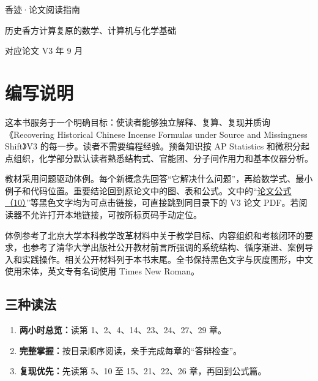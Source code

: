 \documentclass[UTF8,11pt,openany,fontset=none]{ctexbook}
\newcommand{\paperpage}[2]{\href{run:xiangji_source_stable_v3.pdf\#page=#1}{#2}}
\newcommand{\paperformula}[2]{\paperpage{#2}{论文公式（#1）}}
\begin{document}
\begin{titlepage}
\thispagestyle{empty}
\vspace*{0.28\textheight}
\begin{center}
{\fontsize{36}{48}\selectfont 香迹·论文阅读指南}\par
\vspace{1.4em}
{\large 历史香方计算复原的数学、计算机与化学基础}\par
\vfill
{\small 对应论文 V3 年 9 月}\par
\end{center}
\end{titlepage}

\frontmatter

\chapter*{编写说明}

这本书服务于一个明确目标：使读者能够独立解释、复算、复现并质询《Recovering Historical Chinese Incense Formulas under Source and Missingness Shift》V3 的每一步。读者不需要编程经验。预备知识按 AP Statistics 和微积分起点组织，化学部分默认读者熟悉结构式、官能团、分子间作用力和基本仪器分析。

教材采用问题驱动体例。每个新概念先回答“它解决什么问题”，再给数学式、最小例子和代码位置。重要结论回到原论文中的图、表和公式。文中的“\paperformula{10}{6}”等黑色文字均为可点击链接，可直接跳到同目录下的 V3 论文 PDF。若阅读器不允许打开本地链接，可按所标页码手动定位。

体例参考了北京大学本科教学改革材料中关于教学目标、内容组织和考核闭环的要求，也参考了清华大学出版社公开教材前言所强调的系统结构、循序渐进、案例导入和实践操作。相关公开材料列于本书末尾。全书保持黑色文字与灰度图形，中文使用宋体，英文专有名词使用 Times New Roman。

\section*{三种读法}

\begin{enumerate}
\item \textbf{两小时总览：}读第 1、2、4、14、23、24、27、29 章。
\item \textbf{完整掌握：}按目录顺序阅读，亲手完成每章的“答辩检查”。
\item \textbf{复现优先：}先读第 5、10 至 15、21、22、26 章，再回到公式篇。
\end{enumerate}
\end{document}
